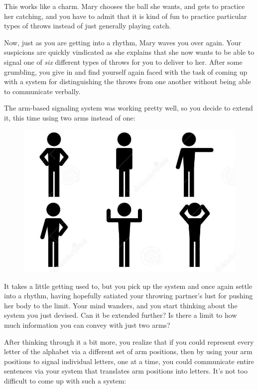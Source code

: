 \documentclass[UTF8]{book}
\begin{document}
\begin{CJK}{UTF8}{gbsn}
This works like a charm. Mary chooses the ball she wants, and gets to practice her catching, and you have to admit that it is kind of fun to practice particular types of throws instead of just generally playing catch.

Now, just as you are getting into a rhythm, Mary waves you over again. Your suspicions are quickly vindicated as she explains that she now wants to be able to signal one of \emph{six} different types of throws for you to deliver to her. After some grumbling, you give in and find yourself again faced with the task of coming up with a system for distinguishing the throws from one another without being able to communicate verbally.

The arm-based signaling system was working pretty well, so you decide to extend it, this time using two arms instead of one:

\begin{figure}[H]
\centering
\includegraphics{stick-figure-six-positions-simplified}
\end{figure}

It takes a little getting used to, but you pick up the system and once again settle into a rhythm, having hopefully satiated your throwing partner's lust for pushing her body to the limit. Your mind wanders, and you start thinking about the system you just devised. Can it be extended further? Is there a limit to how much information you can convey with just two arms?

After thinking through it a bit more, you realize that if you could represent every letter of the alphabet via a different set of arm positions, then by using your arm positions to signal individual letters, one at a time, you could communicate entire sentences via your system that translates arm positions into letters.  It's not too difficult to come up with such a system:


\end{CJK}
\end{document}
